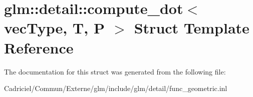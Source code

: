 \hypertarget{structglm_1_1detail_1_1compute__dot}{}\section{glm\+:\+:detail\+:\+:compute\+\_\+dot$<$ vec\+Type, T, P $>$ Struct Template Reference}
\label{structglm_1_1detail_1_1compute__dot}


The documentation for this struct was generated from the following file\+:\begin{DoxyCompactItemize}
\item 
Cadriciel/\+Commun/\+Externe/glm/include/glm/detail/func\+\_\+geometric.\+inl\end{DoxyCompactItemize}
